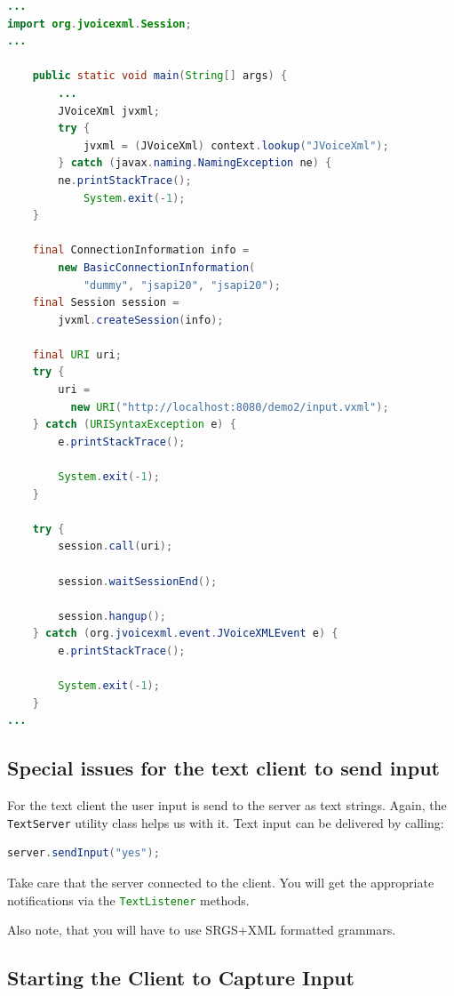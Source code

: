 \documentclass[11pt,a4paper]{book}
\begin{document}
\begin{lstlisting}[language=Java]
...
import org.jvoicexml.Session;
...

    public static void main(String[] args) {
        ...
        JVoiceXml jvxml;
        try {
            jvxml = (JVoiceXml) context.lookup("JVoiceXml");
        } catch (javax.naming.NamingException ne) {
	    ne.printStackTrace();
            System.exit(-1);
    }

    final ConnectionInformation info =
        new BasicConnectionInformation(
            "dummy", "jsapi20", "jsapi20");
    final Session session = 
        jvxml.createSession(info);

    final URI uri;
    try {
        uri = 
          new URI("http://localhost:8080/demo2/input.vxml");
    } catch (URISyntaxException e) {
        e.printStackTrace();

        System.exit(-1);
    }

    try {
        session.call(uri);

        session.waitSessionEnd();

        session.hangup();
    } catch (org.jvoicexml.event.JVoiceXMLEvent e) {
        e.printStackTrace();

        System.exit(-1);
    }
...
\end{lstlisting}

\subsection{Special issues for the text client to send input}

For the text client the user input is send to the server as text strings. Again,
the \lstinline[language=Java]{TextServer} utility class helps us with it.
Text input can be delivered by calling:

\begin{lstlisting}[language=Java]
    server.sendInput("yes");
\end{lstlisting}

Take care that the server connected to the client. You will get the
appropriate notifications via the \lstinline[language=java]{TextListener}
methods.

Also note, that you will have to use SRGS+XML formatted grammars.

\subsection{Starting the Client to Capture Input}
\label{sec:starting-the-client}
\end{document}
